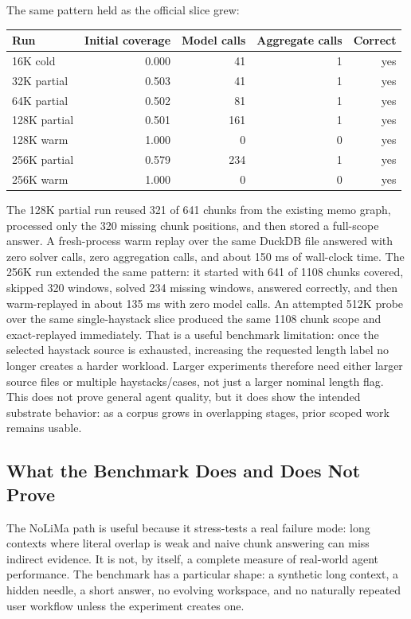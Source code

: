 \documentclass[11pt]{article}
\begin{document}
The same pattern held as the official slice grew:

\begin{center}
\begin{tabular}{lrrrr}
\toprule
Run & Initial coverage & Model calls & Aggregate calls & Correct \\
\midrule
16K cold & 0.000 & 41 & 1 & yes \\
32K partial & 0.503 & 41 & 1 & yes \\
64K partial & 0.502 & 81 & 1 & yes \\
128K partial & 0.501 & 161 & 1 & yes \\
128K warm & 1.000 & 0 & 0 & yes \\
256K partial & 0.579 & 234 & 1 & yes \\
256K warm & 1.000 & 0 & 0 & yes \\
\bottomrule
\end{tabular}
\end{center}

The 128K partial run reused 321 of 641 chunks from the existing memo graph,
processed only the 320 missing chunk positions, and then stored a full-scope
answer. A fresh-process warm replay over the same DuckDB file answered with
zero solver calls, zero aggregation calls, and about 150 ms of wall-clock time.
The 256K run extended the same pattern: it started with 641 of 1108 chunks
covered, skipped 320 windows, solved 234 missing windows, answered correctly,
and then warm-replayed in about 135 ms with zero model calls.
An attempted 512K probe over the same single-haystack slice produced the same
1108 chunk scope and exact-replayed immediately. That is a useful benchmark
limitation: once the selected haystack source is exhausted, increasing the
requested length label no longer creates a harder workload. Larger experiments
therefore need either larger source files or multiple haystacks/cases, not just
a larger nominal length flag.
This does not prove general agent quality, but it does show the intended
substrate behavior: as a corpus grows in overlapping stages, prior scoped work
remains usable.

\subsection{What the Benchmark Does and Does Not Prove}

The NoLiMa path is useful because it stress-tests a real failure mode: long
contexts where literal overlap is weak and naive chunk answering can miss
indirect evidence. It is not, by itself, a complete measure of real-world agent
performance. The benchmark has a particular shape: a synthetic long context, a
hidden needle, a short answer, no evolving workspace, and no naturally repeated
user workflow unless the experiment creates one.
\end{document}
